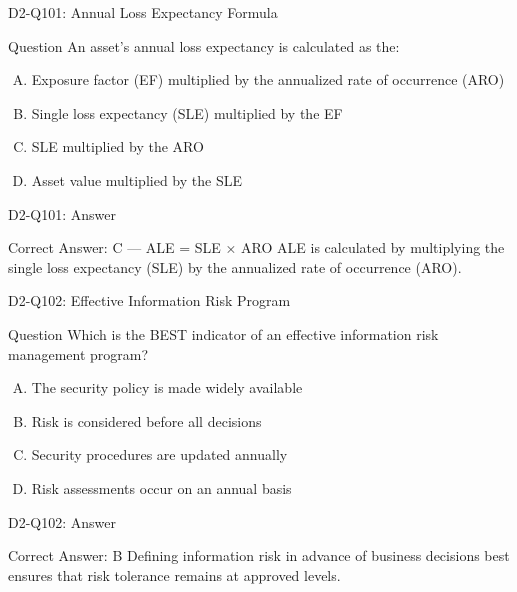 \documentclass{beamer}
\begin{document}
	\begin{frame}{D2-Q101: Annual Loss Expectancy Formula}
		\begin{block}{Question}
			An asset's annual loss expectancy is calculated as the:
		\end{block}
		\begin{enumerate}[(A)]
			\item Exposure factor (EF) multiplied by the annualized rate of occurrence (ARO)
			\item Single loss expectancy (SLE) multiplied by the EF
			\item SLE multiplied by the ARO
			\item Asset value multiplied by the SLE
		\end{enumerate}
	\end{frame}
	\begin{frame}{D2-Q101: Answer}
		\begin{block}{Correct Answer: C --- ALE = SLE × ARO}
			ALE is calculated by multiplying the single loss expectancy (SLE) by the annualized rate of occurrence (ARO).
		\end{block}
	\end{frame}
	
	\begin{frame}{D2-Q102: Effective Information Risk Program}
		\begin{block}{Question}
			Which is the BEST indicator of an effective information risk management program?
		\end{block}
		\begin{enumerate}[(A)]
			\item The security policy is made widely available
			\item Risk is considered before all decisions
			\item Security procedures are updated annually
			\item Risk assessments occur on an annual basis
		\end{enumerate}
	\end{frame}
	\begin{frame}{D2-Q102: Answer}
		\begin{block}{Correct Answer: B}
			Defining information risk in advance of business decisions best ensures that risk tolerance remains at approved levels.
		\end{block}
	\end{frame}
	
\end{document}
